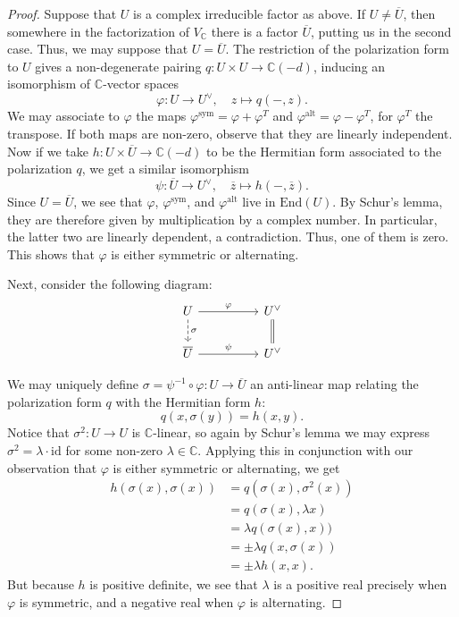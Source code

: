 \documentclass[12pt]{amsart}
\newcommand{\C}{\mathbb{C}}
\newcommand{\End}{\text{End}}
\theoremstyle{definition}
\theoremstyle{remark}
\numberwithin{equation}{section}
\begin{document}
\begin{proof}
Suppose that $U$ is a complex irreducible factor as above. If $U \neq \overline{U}$,
then somewhere in the factorization of $V_\C$ there is a factor $\overline{U}$,
putting us in the second case. Thus, we may suppose that $U = \overline{U}$. The
restriction of the polarization form to $U$ gives a non-degenerate pairing
\( q: U \times U \to \C(-d) \), inducing an isomorphism of $\C$-vector spaces
\begin{equation}
    \varphi: U \to U^\vee, \quad z \mapsto q(-, z).
\end{equation}
We may associate to $\varphi$ the maps $\varphi^{\textrm{sym}} = \varphi + \varphi^T$
and $\varphi^{\textrm{alt}} = \varphi - \varphi^T$, for \(\varphi^T\) the transpose.
If both maps are non-zero, observe that they are linearly independent. Now if we take 
\(h: U \times \overline{U} \to \C(-d)\) to be the Hermitian form associated to the
polarization \(q\), we get a similar isomorphism 
\begin{equation}
    \psi: \overline{U} \to U^\vee, \quad \overline{z} \mapsto h(-, \overline{z}).
\end{equation}
Since $U = \overline{U}$, we see that $\varphi$, $\varphi^{\textrm{sym}}$, and
$\varphi^{\textrm{alt}}$ live in $\End(U)$. By Schur's lemma, they are therefore
given by multiplication by a complex number. In particular, the latter two are
linearly dependent, a contradiction. Thus, one of them is zero. This shows that
$\varphi$ is either symmetric or alternating.

Next, consider the following diagram:
\begin{equation*}
    \begin{tikzcd}
    U \arrow[dashed]{d}{\sigma} \arrow{rr}{\varphi} && U^\vee \arrow[equals]{d} \\
    \overline{U} \arrow{rr}{\psi} && U^\vee
    \end{tikzcd}
\end{equation*}

We may uniquely define 
\(\sigma = \psi^{-1} \circ \varphi: U \to \overline{U}\)
an anti-linear map relating the polarization form $q$ with the Hermitian form $h$:
\begin{equation}
    q(x, \sigma(y)) = h(x, y).
\end{equation}
Notice that $\sigma^2: U \to U$ is $\C$-linear, so again by Schur's lemma we may
express $\sigma^2 = \lambda \cdot \mathrm{id}$ for some non-zero $\lambda \in \C$.
Applying this in conjunction with our observation that $\varphi$ is either symmetric
or alternating, we get
\begin{align*}
    h(\sigma(x), \sigma(x)) &= q(\sigma(x), \sigma^2(x)) \\
    &= q(\sigma(x), \lambda x) \\
    &= \lambda q(\sigma(x), x)) \\
    &= \pm \lambda q(x, \sigma(x)) \\
    &= \pm \lambda h(x, x).
\end{align*}
But because $h$ is positive definite, we see that $\lambda$ is a positive real
precisely when $\varphi$ is symmetric, and a negative real when $\varphi$ is
alternating.


\end{proof}
\end{document}
